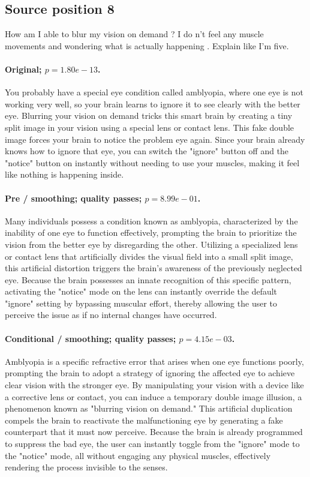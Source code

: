 \subsection*{Source position 8}
How am I able to blur my vision on demand ? I do n't feel any muscle movements and wondering what is actually happening . Explain like I'm five.

\paragraph{Original; $p=1.80e-13$.} You probably have a special eye condition called amblyopia, where one eye is not working very well, so your brain learns to ignore it to see clearly with the better eye. Blurring your vision on demand tricks this smart brain by creating a tiny split image in your vision using a special lens or contact lens. This fake double image forces your brain to notice the problem eye again. Since your brain already knows how to ignore that eye, you can switch the "ignore" button off and the "notice" button on instantly without needing to use your muscles, making it feel like nothing is happening inside.


\paragraph{Pre / smoothing; quality passes; $p=8.99e-01$.} Many individuals possess a condition known as amblyopia, characterized by the inability of one eye to function effectively, prompting the brain to prioritize the vision from the better eye by disregarding the other. Utilizing a specialized lens or contact lens that artificially divides the visual field into a small split image, this artificial distortion triggers the brain's awareness of the previously neglected eye. Because the brain possesses an innate recognition of this specific pattern, activating the "notice" mode on the lens can instantly override the default "ignore" setting by bypassing muscular effort, thereby allowing the user to perceive the issue as if no internal changes have occurred.

\paragraph{Conditional / smoothing; quality passes; $p=4.15e-03$.} Amblyopia is a specific refractive error that arises when one eye functions poorly, prompting the brain to adopt a strategy of ignoring the affected eye to achieve clear vision with the stronger eye. By manipulating your vision with a device like a corrective lens or contact, you can induce a temporary double image illusion, a phenomenon known as "blurring vision on demand." This artificial duplication compels the brain to reactivate the malfunctioning eye by generating a fake counterpart that it must now perceive. Because the brain is already programmed to suppress the bad eye, the user can instantly toggle from the "ignore" mode to the "notice" mode, all without engaging any physical muscles, effectively rendering the process invisible to the senses.

